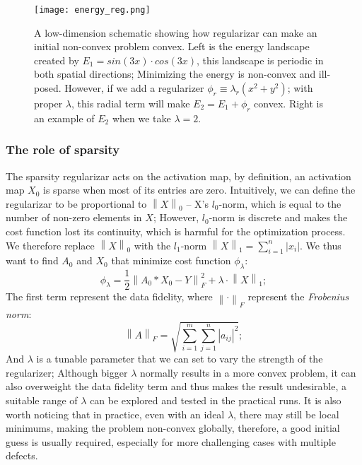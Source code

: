\begin{figure}
	\texttt{[image: energy\_reg.png]} 
	\centering
	\caption{A low-dimension schematic showing how regularizar can make an initial non-convex problem convex. Left is the energy landscape created by $E_1 = sin(3x)\cdot cos(3x)$, this landscape is periodic in both spatial directions; Minimizing the energy is non-convex and ill-posed. However, if we add a regularizer $\phi_r \equiv \lambda_r(x^2 + y^2)$; with proper $\lambda$, this radial term will make $E_2 = E_1 + \phi_r$ convex. Right is an example of $E_2$ when we take $\lambda=2$.}
	\label{fig:ch6_reg}
\end{figure}

\subsubsection{The role of sparsity}
The sparsity regularizar acts on the activation map, by definition, an activation map $X_0$ is sparse when most of its entries are zero. Intuitively, we can define the regularizar to be proportional to $\left\lVert X\right\rVert_0$ -- X's $l_0$-norm, which is equal to the number of non-zero elements in $X$; However, $l_0$-norm is discrete and makes the cost function lost its continuity, which is harmful for the optimization process. We therefore replace $\left\lVert X\right\rVert_0$ with the $l_1$-norm $\left\lVert X\right\rVert_1 = \sum_{i=1}^{n}\vert x_i \vert$. We thus want to find $A_0$ and $X_0$ that minimize cost function $\phi_{\lambda}$:
\begin{equation}
	\phi_{\lambda} = \frac{1}{2}\left\lVert A_0 * X_0 - Y \right\rVert^2_F + \lambda \cdot \left\lVert X\right\rVert_1;
\end{equation}
\noindent The first term represent the data fidelity, where $\left\lVert \cdot\right\rVert_F$ represent the \textit{Frobenius norm}: 
\[
\left\lVert A \right\rVert_F = \sqrt{ \sum_{i=1}^{m} \sum_{j=1}^{n} |a_{ij}|^2 };
\] 
\noindent And $\lambda$ is a tunable parameter that we can set to vary the strength of the regularizer; Although bigger $\lambda$ normally results in a more convex problem, it can also overweight the data fidelity term and thus makes the result undesirable, a suitable range of $\lambda$ can be explored and tested in the practical runs. It is also worth noticing that in practice, even with an ideal $\lambda$, there may still be local minimums, making the problem non-convex globally, therefore, a good initial guess is usually required, especially for more challenging cases with multiple defects. 

